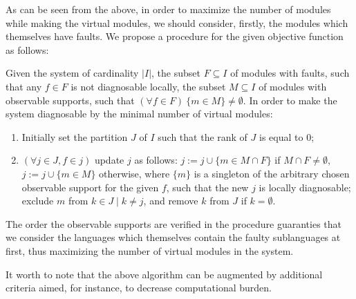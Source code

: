 As can be seen from the above, in order to maximize the number of modules while
making the virtual modules, we should consider, firstly, the modules which
themselves have faults. We propose a procedure for the given objective function
as follows:

Given the system of cardinality $|I|$, the subset $F \subseteq I$ of modules
with faults, such that any $f\in F$ is not diagnosable locally, the subset $M
\subseteq I$ of modules with observable supports, such that $(\forall f \in
F)~\{m \in M\}\neq \emptyset$. In order to make the system diagnosable by
the minimal number of virtual modules:
\begin{enumerate}
  \item Initially set the partition $J$ of $I$ such that the rank of $J$ is
  equal to 0;
  \item $(\forall j \in J, f \in j)$ update $j$ as follows: 
  	$j := j \cup \{m \in M \cap F\}$ if $M \cap F \neq \emptyset$,
 $j := j \cup \{m \in M\}$ otherwise, where $\{m\}$ is a singleton of the
 arbitrary chosen observable support for the given $f$, such that the new $j$
 is locally diagnosable; exclude $m$ from $k \in J \mid k \neq j$, and remove
 $k$ from $J$ if $k=\emptyset$.
\end{enumerate} 
The order the observable supports are verified in the procedure guaranties that
we consider the languages which themselves contain the faulty
sublanguages at first, thus maximizing the number of virtual modules in the
system.

It worth to note that the above algorithm can be augmented by additional
criteria aimed, for instance, to decrease computational burden.


